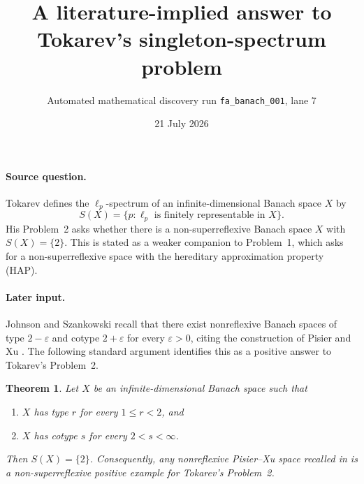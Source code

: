 \documentclass[11pt]{article}
\title{A literature-implied answer to Tokarev's singleton-spectrum problem}
\author{Automated mathematical discovery run \texttt{fa\_banach\_001}, lane 7}
\date{21 July 2026}
\newtheorem{theorem}{Theorem}
\begin{document}
\maketitle

\paragraph{Source question.}
Tokarev \cite{Tokarev} defines the $\ell_p$-spectrum of an infinite-dimensional
Banach space $X$ by
\[
  S(X)=\{p:\ell_p\text{ is finitely representable in }X\}.
\]
His Problem~2 asks whether there is a non-superreflexive Banach space $X$
with $S(X)=\{2\}$.  This is stated as a weaker companion to Problem~1,
which asks for a non-superreflexive space with the hereditary approximation
property (HAP).

\paragraph{Later input.}
Johnson and Szankowski \cite[p.~1999, immediately after Question~3]{JS}
recall that there exist nonreflexive Banach spaces of type $2-\varepsilon$
and cotype $2+\varepsilon$ for every $\varepsilon>0$, citing the construction
of Pisier and Xu \cite{PX}.  The following standard argument identifies this
as a positive answer to Tokarev's Problem~2.

\begin{theorem}
Let $X$ be an infinite-dimensional Banach space such that
\begin{enumerate}
  \item $X$ has type $r$ for every $1\le r<2$, and
  \item $X$ has cotype $s$ for every $2<s<\infty$.
\end{enumerate}
Then $S(X)=\{2\}$.  Consequently, any nonreflexive Pisier--Xu space recalled
in \cite{JS} is a non-superreflexive positive example for Tokarev's
Problem~2.
\end{theorem}
\end{document}
